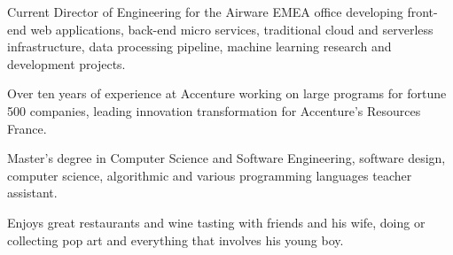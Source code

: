
\begin{cvparagraph}

Current Director of Engineering for the Airware EMEA office developing front-end web applications, back-end micro services, traditional cloud and serverless infrastructure, data processing pipeline, machine learning research and development projects.

Over ten years of experience at Accenture working on large programs for fortune 500 companies, leading innovation transformation for Accenture’s Resources France.

Master’s degree in Computer Science and Software Engineering, software design, computer science, algorithmic and various programming languages teacher assistant.

Enjoys great restaurants and wine tasting with friends and his wife, doing or collecting pop art and everything that involves his young boy.

\end{cvparagraph}


